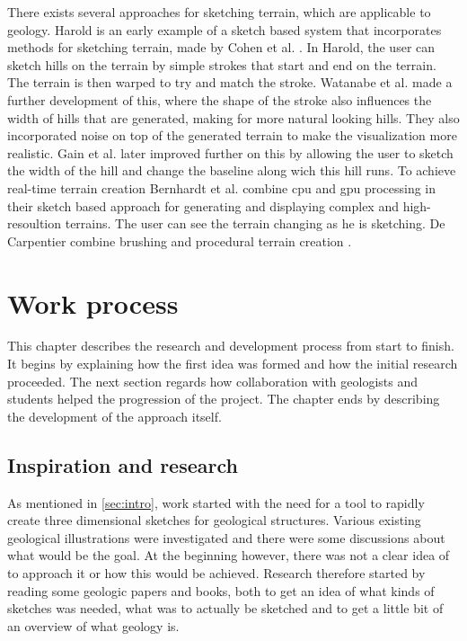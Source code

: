 \documentclass[a4paper,12pt]{report}
\newcommand{\secref}[1]{\autoref{#1}}
\begin{document}
There exists several approaches for sketching terrain, which are applicable to geology. Harold is an early example of a sketch based system that incorporates methods for sketching terrain, made by Cohen et al. \cite{cohen2000harold}. In Harold, the user can sketch hills on the terrain by simple strokes that start and end on the terrain. The terrain is then warped to try and match the stroke. Watanabe et al.  \cite{Watanabe:2004:SIT:1186415.1186500} made a further development of this, where the shape of the stroke also influences the width of hills that are generated, making for more natural looking hills. They also incorporated noise on top of the generated terrain to make the visualization more realistic. Gain et al. \cite{Gain:2009:TS:1507149.1507155} later improved further on this by allowing the user to sketch the width of the hill and change the baseline along wich this hill runs. To achieve real-time terrain creation Bernhardt et al. combine cpu and gpu processing in their sketch based approach for generating and displaying complex and high-resoultion terrains. The user can see the terrain changing as he is sketching. De Carpentier combine brushing and procedural terrain creation \cite{de2009interactive}.


\clearpage



\chapter{Work process}
This chapter describes the research and development process from start to finish. It begins by explaining how the first idea was formed and how the initial research proceeded. The next section regards how collaboration with geologists and students helped the progression of the project. The chapter ends by describing the development of the approach itself.
\label{subsec:work}
\section{Inspiration and research}
As mentioned in \secref{sec:intro}, work started with the need for a tool to rapidly create three dimensional sketches for geological structures. Various existing geological illustrations were investigated and there were some discussions about what would be the goal. At the beginning however, there was not a clear idea of to approach it or how this would be achieved. Research therefore started by reading some geologic papers and books, both to get an idea of what kinds of sketches was needed, what was to actually be sketched and to get a little bit of an overview of what geology is.
\end{document}
